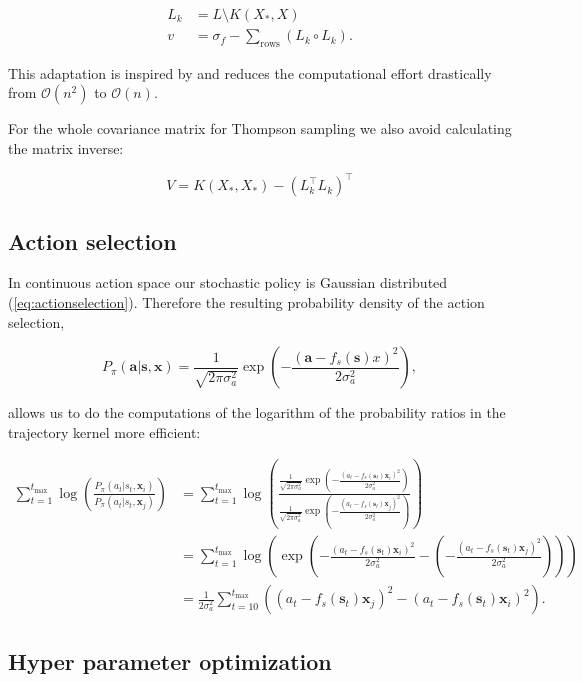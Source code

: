 \begin{align}
    L_k &= L \setminus K(X_*,X) \\
    v &= \sigma_f - \sum_{\text{rows}} (L_k \circ L_k). \label{eq:vectorvar}
\end{align}

This adaptation is inspired by \cite{nandoCode} and reduces the computational effort drastically from $\mathcal{O}(n^2)$ to $\mathcal{O}(n)$.

For the whole covariance matrix for Thompson sampling we also avoid calculating the matrix inverse:

$$V = K(X_*,X_*) - (L_k^\top L_k)^\top $$

\subsection{Action selection}

In continuous action space our stochastic policy is Gaussian distributed (\ref{eq:actionselection}). Therefore the resulting probability density of the action selection,

$$P_{\pi}(\mathbf{a}|\mathbf{s},\mathbf{x}) = \frac{1}{\sqrt{2\pi\sigma_a^2}}\exp\left(-\frac{(\mathbf{a}-f_s(\mathbf{s})x)^2}{2\sigma_a^2}\right),$$

allows us to do the computations of the logarithm of the probability ratios in the trajectory kernel more efficient:

\begin{align*}
    \sum_{t=1}^{t_\mathrm{max}} \log \left(\frac{P_{\pi}(a_{t}|s_{t},\mathbf{x}_i)}{P_{\pi}(a_{t}|s_{t},\mathbf{x}_j)}\right) &= \sum_{t=1}^{t_\mathrm{max}} \log \left(\frac{\frac{1}{\sqrt{2\pi\sigma_a^2}}\exp\left(-\frac{(a_t-f_s(\mathbf{s}_t)\mathbf{x}_i)^2}{2\sigma_a^2}\right)}{\frac{1}{\sqrt{2\pi\sigma_a^2}}\exp\left(-\frac{(a_t-f_s(\mathbf{s}_t)\mathbf{x}_j)^2}{2\sigma_a^2}\right)}\right)\\
    &= \sum_{t=1}^{t_\mathrm{max}} \log \left( \exp \left( -\frac{(a_t-f_s(\mathbf{s}_t)\mathbf{x}_i)^2}{2\sigma_a^2} - \left(-\frac{(a_t-f_s(\mathbf{s}_t)\mathbf{x}_j)^2}{2\sigma_a^2}\right)\right)\right)\\
    &= \frac{1}{2\sigma_a^2} \sum_{t=10}^{t_\mathrm{max}} \left((a_t-f_s(\mathbf{s}_t)\mathbf{x}_j)^2 - (a_t-f_s(\mathbf{s}_t)\mathbf{x}_i)^2\right).
\end{align*}

\subsection{Hyper parameter optimization}

